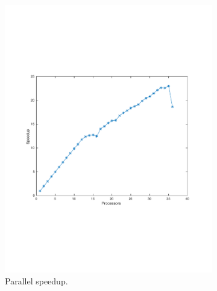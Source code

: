 \begin{figure}
        \centering
        \begin{subfigure}[b]{0.45\textwidth}
			\includegraphics[width=\textwidth]{./figures/speedup}
			\caption{Parallel speedup.}
			\label{fig:speedup}
        \end{subfigure}
        ~ %
        \begin{subfigure}[b]{0.45\textwidth}

\end{subfigure}
\end{figure}
